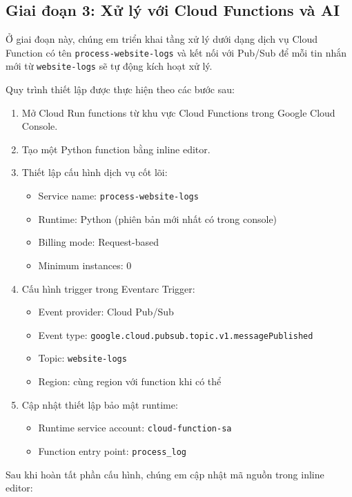 \subsection{Giai đoạn 3: Xử lý với Cloud Functions và AI}

Ở giai đoạn này, chúng em triển khai tầng xử lý dưới dạng dịch vụ Cloud Function có tên \texttt{process-website-logs} và kết nối với Pub/Sub để mỗi tin nhắn mới từ \texttt{website-logs} sẽ tự động kích hoạt xử lý.

Quy trình thiết lập được thực hiện theo các bước sau:

\begin{enumerate}
    \item Mở Cloud Run functions từ khu vực Cloud Functions trong Google Cloud Console.
    \item Tạo một Python function bằng inline editor.
    \item Thiết lập cấu hình dịch vụ cốt lõi:
    \begin{itemize}
        \item Service name: \texttt{process-website-logs}
        \item Runtime: Python (phiên bản mới nhất có trong console)
        \item Billing mode: Request-based
        \item Minimum instances: 0
    \end{itemize}
    \item Cấu hình trigger trong Eventarc Trigger:
    \begin{itemize}
        \item Event provider: Cloud Pub/Sub
        \item Event type: \texttt{google.cloud.pubsub.topic.v1.messagePublished}
        \item Topic: \texttt{website-logs}
        \item Region: cùng region với function khi có thể
    \end{itemize}
    \item Cập nhật thiết lập bảo mật runtime:
    \begin{itemize}
        \item Runtime service account: \texttt{cloud-function-sa}
        \item Function entry point: \texttt{process\_log}
    \end{itemize}
\end{enumerate}

Sau khi hoàn tất phần cấu hình, chúng em cập nhật mã nguồn trong inline editor:

